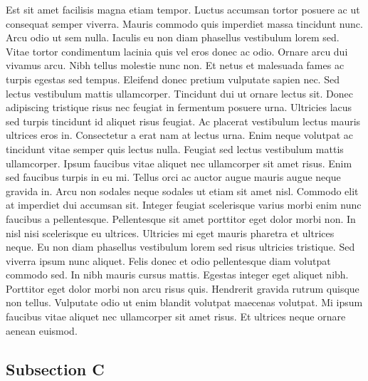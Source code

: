 \documentclass[12pt]{article}
\begin{document}
\par Est sit amet facilisis magna etiam tempor. Luctus accumsan tortor posuere ac ut consequat semper viverra. Mauris commodo quis imperdiet massa tincidunt nunc. Arcu odio ut sem nulla. Iaculis eu non diam phasellus vestibulum lorem sed. Vitae tortor condimentum lacinia quis vel eros donec ac odio. Ornare arcu dui vivamus arcu. Nibh tellus molestie nunc non. Et netus et malesuada fames ac turpis egestas sed tempus. Eleifend donec pretium vulputate sapien nec. Sed lectus vestibulum mattis ullamcorper. Tincidunt dui ut ornare lectus sit. Donec adipiscing tristique risus nec feugiat in fermentum posuere urna. Ultricies lacus sed turpis tincidunt id aliquet risus feugiat. Ac placerat vestibulum lectus mauris ultrices eros in. Consectetur a erat nam at lectus urna. Enim neque volutpat ac tincidunt vitae semper quis lectus nulla. Feugiat sed lectus vestibulum mattis ullamcorper. Ipsum faucibus vitae aliquet nec ullamcorper sit amet risus. Enim sed faucibus turpis in eu mi. Tellus orci ac auctor augue mauris augue neque gravida in. Arcu non sodales neque sodales ut etiam sit amet nisl. Commodo elit at imperdiet dui accumsan sit. Integer feugiat scelerisque varius morbi enim nunc faucibus a pellentesque. Pellentesque sit amet porttitor eget dolor morbi non. In nisl nisi scelerisque eu ultrices. Ultricies mi eget mauris pharetra et ultrices neque. Eu non diam phasellus vestibulum lorem sed risus ultricies tristique. Sed viverra ipsum nunc aliquet. Felis donec et odio pellentesque diam volutpat commodo sed. In nibh mauris cursus mattis. Egestas integer eget aliquet nibh. Porttitor eget dolor morbi non arcu risus quis. Hendrerit gravida rutrum quisque non tellus. Vulputate odio ut enim blandit volutpat maecenas volutpat. Mi ipsum faucibus vitae aliquet nec ullamcorper sit amet risus. Et ultrices neque ornare aenean euismod.

\subsection{Subsection C} \label{sec:subc}
\end{document}
